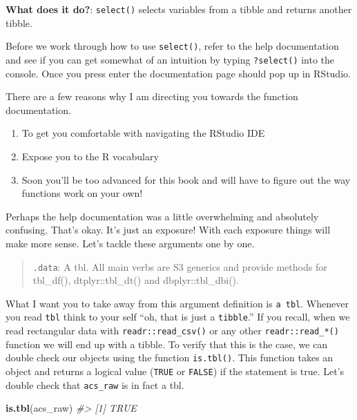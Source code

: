 \documentclass[
]{book}
\newenvironment{Shaded}{\begin{snugshade}}{\end{snugshade}}
\newcommand{\CommentTok}[1]{\textcolor[rgb]{0.56,0.35,0.01}{\textit{#1}}}
\newcommand{\KeywordTok}[1]{\textcolor[rgb]{0.13,0.29,0.53}{\textbf{#1}}}
\newcommand{\NormalTok}[1]{#1}
\providecommand{\tightlist}{%
  \setlength{\itemsep}{0pt}\setlength{\parskip}{0pt}}
\begin{document}
\textbf{What does it do?}: \texttt{select()} selects variables from a tibble and returns another tibble.

Before we work through how to use \texttt{select()}, refer to the help documentation and see if you can get somewhat of an intuition by typing \texttt{?select()} into the console. Once you press enter the documentation page should pop up in RStudio.

There are a few reasons why I am directing you towards the function documentation.

\begin{enumerate}
\def\labelenumi{\arabic{enumi}.}
\tightlist
\item
  To get you comfortable with navigating the RStudio IDE
\item
  Expose you to the R vocabulary
\item
  Soon you'll be too advanced for this book and will have to figure out the way functions work on your own!
\end{enumerate}

Perhaps the help documentation was a little overwhelming and absolutely confusing. That's okay. It's just an exposure! With each exposure things will make more sense. Let's tackle these arguments one by one.

\begin{quote}
\texttt{.data}: A tbl. All main verbs are S3 generics and provide methods for tbl\_df(), dtplyr::tbl\_dt() and dbplyr::tbl\_dbi().
\end{quote}

What I want you to take away from this argument definition is \texttt{a\ tbl}. Whenever you read \texttt{tbl} think to your self ``oh, that is just a \texttt{tibble}.'' If you recall, when we read rectangular data with \texttt{readr::read\_csv()} or any other \texttt{readr::read\_*()} function we will end up with a tibble. To verify that this is the case, we can double check our objects using the function \texttt{is.tbl()}. This function takes an object and returns a logical value (\texttt{TRUE} or \texttt{FALSE}) if the statement is true. Let's double check that \texttt{acs\_raw} is in fact a tbl.

\begin{Shaded}
\begin{Highlighting}[]
\KeywordTok{is.tbl}\NormalTok{(acs\_raw)}
\CommentTok{\#\textgreater{} [1] TRUE}
\end{Highlighting}
\end{Shaded}
\end{document}
